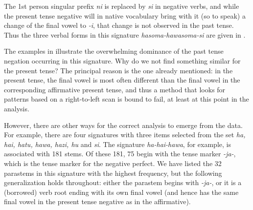 \documentclass[output=paper,colorlinks,citecolor=brown]{langscibook}
\begin{document}
The 1st person singular prefix \textit{ni} is replaced by \textit{si} in negative verbs, and while the present tense negative will in native vocabulary bring with it (so to speak) a change of the final vowel to \textit{-i}, that change is not observed in the past tense. Thus the three verbal forms in this signature \textit{hasoma-hawasoma-si} are given in .
 
The examples in  illustrate the overwhelming dominance of the past tense negation occurring in this signature. Why do we not find something similar for the present tense? The principal reason is the one already mentioned: in the present tense, the final vowel is most often different than the final vowel in the corresponding affirmative present tense, and thus a method that looks for patterns based on a right-to-left scan is bound to fail, at least at this point in the analysis.

However, there are other ways for the correct analysis to emerge from the data. For example, there are four signatures with three items selected from the set \textit{ha, hai, hatu, hawa, hazi, hu} and \textit{si}. The signature \textit{ha-hai-hawa}, for example, is associated with 181 stems. Of these 181, 75 begin with the tense marker \textit{-ja-}, which is the tense marker for the negative perfect. We have listed the 32 parastems in this signature with the highest frequency, but the following generalization holds throughout: either the parastem begins with \textit{-ja-}, or it is a (borrowed) verb root ending with its own final vowel (and hence has the same final vowel in the present tense negative as in the affirmative).
\end{document}
